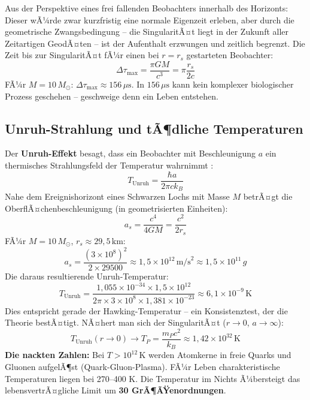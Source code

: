 ﻿\documentclass[12pt,a4paper]{report}
\begin{document}
Aus der Perspektive eines frei fallenden Beobachters innerhalb des Horizonts: Dieser wÃ¼rde zwar kurzfristig eine normale Eigenzeit erleben, aber durch die geometrische Zwangsbedingung -- die SingularitÃ¤t liegt in der Zukunft aller Zeitartigen GeodÃ¤ten -- ist der Aufenthalt erzwungen und zeitlich begrenzt. Die Zeit bis zur SingularitÃ¤t fÃ¼r einen bei $r = r_s$ gestarteten Beobachter:
\begin{equation}
    \Delta\tau_{\text{max}} = \frac{\pi G M}{c^3} = \pi \frac{r_s}{2c}
    \label{eq:schwingungszeit_innen}
\end{equation}
FÃ¼r $M = 10\,M_\odot$: $\Delta\tau_{\text{max}} \approx 156\,\mu\text{s}$. In $156\,\mu\text{s}$ kann kein komplexer biologischer Prozess geschehen -- geschweige denn ein Leben entstehen.

\subsection{Unruh-Strahlung und tÃ¶dliche Temperaturen}

Der \textbf{Unruh-Effekt} besagt, dass ein Beobachter mit Beschleunigung $a$ ein thermisches Strahlungsfeld der Temperatur wahrnimmt \cite{unruh1976}:
\begin{equation}
    T_{\text{Unruh}} = \frac{\hbar a}{2\pi c k_B}
    \label{eq:unruh_temperatur}
\end{equation}
Nahe dem Ereignishorizont eines Schwarzen Lochs mit Masse $M$ betrÃ¤gt die OberflÃ¤chenbeschleunigung (in geometrisierten Einheiten):
\begin{equation}
    a_s = \frac{c^4}{4GM} = \frac{c^2}{2r_s}
    \label{eq:oberflaechen_beschleunigung}
\end{equation}
FÃ¼r $M = 10\,M_\odot$, $r_s \approx 29{,}5\,\text{km}$:
\begin{equation}
    a_s = \frac{(3 \times 10^8)^2}{2 \times 29500} \approx 1{,}5 \times 10^{12}\,\text{m/s}^2 \approx 1{,}5 \times 10^{11}\,g
    \label{eq:beschleunigung_zahlenwert}
\end{equation}
Die daraus resultierende Unruh-Temperatur:
\begin{equation}
    T_{\text{Unruh}} = \frac{1{,}055 \times 10^{-34} \times 1{,}5 \times 10^{12}}{2\pi \times 3 \times 10^8 \times 1{,}381 \times 10^{-23}} \approx 6{,}1 \times 10^{-9}\,\text{K}
    \label{eq:unruh_zahlenwert}
\end{equation}
Dies entspricht gerade der Hawking-Temperatur -- ein Konsistenztest, der die Theorie bestÃ¤tigt. NÃ¤hert man sich der SingularitÃ¤t ($r \to 0$, $a \to \infty$):
\begin{equation}
    T_{\text{Unruh}}(r \to 0) \to T_P = \frac{m_P c^2}{k_B} \approx 1{,}42 \times 10^{32}\,\text{K}
    \label{eq:unruh_planck}
\end{equation}
\textbf{Die nackten Zahlen:} Bei $T > 10^{12}\,\text{K}$ werden Atomkerne in freie Quarks und Gluonen aufgelÃ¶st (Quark-Gluon-Plasma). FÃ¼r Leben charakteristische Temperaturen liegen bei 270--400 K. Die Temperatur im Nichts Ã¼bersteigt das lebensvertrÃ¤gliche Limit um \textbf{30 GrÃ¶ÃŸenordnungen}.
\end{document}
